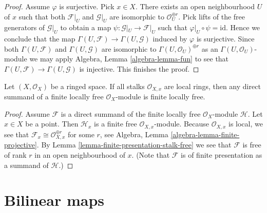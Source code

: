 \begin{proof}
Assume $\varphi$ is surjective. Pick $x \in X$.
There exists an open neighbourhood $U$ of $x$
such that both $\mathcal{F}|_U$ and $\mathcal{G}|_U$ are
isomorphic to $\mathcal{O}_U^{\oplus r}$.
Pick lifts of the free generators of $\mathcal{G}|_U$
to obtain a map $\psi : \mathcal{G}|_U \to \mathcal{F}|_U$
such that $\varphi|_U \circ \psi = \text{id}$.
Hence we conclude that the map
$\Gamma(U, \mathcal{F}) \to \Gamma(U, \mathcal{G})$
induced by $\varphi$ is surjective. Since both
$\Gamma(U, \mathcal{F})$ and $\Gamma(U, \mathcal{G})$
are isomorphic to $\Gamma(U, \mathcal{O}_U)^{\oplus r}$
as an $\Gamma(U, \mathcal{O}_U)$-module we may
apply Algebra, Lemma \ref{algebra-lemma-fun} to see that
$\Gamma(U, \mathcal{F}) \to \Gamma(U, \mathcal{G})$
is injective. This finishes the proof.
\end{proof}

\begin{lemma}
\label{lemma-direct-summand-of-locally-free-is-locally-free}
Let $(X, \mathcal{O}_X)$ be a ringed space. If all stalks $\mathcal{O}_{X, x}$
are local rings, then any direct summand of a finite locally free
$\mathcal{O}_X$-module is finite locally free.
\end{lemma}

\begin{proof}
Assume $\mathcal{F}$ is a direct summand of the finite locally free
$\mathcal{O}_X$-module $\mathcal{H}$.
Let $x \in X$ be a point. Then $\mathcal{H}_x$ is a finite free
$\mathcal{O}_{X, x}$-module.
Because $\mathcal{O}_{X, x}$ is local, we see that
$\mathcal{F}_x \cong \mathcal{O}_{X, x}^{\oplus r}$ for some $r$, see
Algebra, Lemma \ref{algebra-lemma-finite-projective}.
By Lemma \ref{lemma-finite-presentation-stalk-free}
we see that $\mathcal{F}$ is free of rank $r$ in an open neighbourhood of $x$.
(Note that $\mathcal{F}$ is of finite presentation as a summand of
$\mathcal{H}$.)
\end{proof}





\section{Bilinear maps}
\label{section-bilinear}


